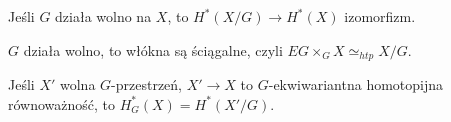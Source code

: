  \begin{twierdzenie}
  Jeśli $G$ działa wolno na $X$, to $H^\ast(X/G) \to H^\ast(X)$ izomorfizm.
 \end{twierdzenie}
 
 \begin{lemat}
  $G$ działa wolno, to włókna są ściągalne, czyli $EG \times_G X \simeq_{htp} X/G$.
 \end{lemat}
 
 \begin{stwierdzenie}
  Jeśli $X'$ wolna $G$-przestrzeń, $X' \to X$ to $G$-ekwiwariantna homotopijna równoważność, to $H_G^\ast(X) = H^\ast(X'/G)$.
 \end{stwierdzenie}
















 
 
